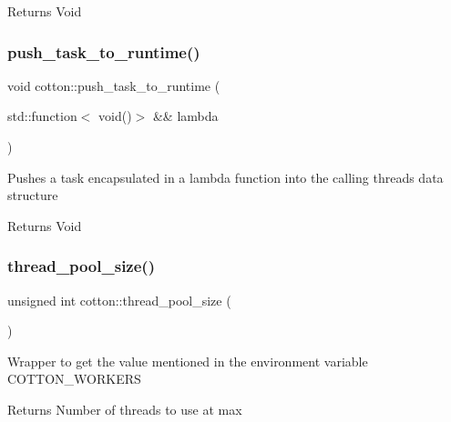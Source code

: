 \begin{DoxyReturn}{Returns}
Void 
\end{DoxyReturn}
\mbox{\label{cotton-runtime_8h_file_a2b2001813bd051cd1ff41a75989667c0}} 
\subsubsection{\texorpdfstring{push\+\_\+task\+\_\+to\+\_\+runtime()}{push\_task\_to\_runtime()}}
{\footnotesize\ttfamily void cotton\+::push\+\_\+task\+\_\+to\+\_\+runtime (\begin{DoxyParamCaption}\item[{std\+::function$<$ void()$>$ \&\&}]{lambda }\end{DoxyParamCaption})}

Pushes a task encapsulated in a lambda function into the calling thread\textquotesingle{}s data structure

\begin{DoxyReturn}{Returns}
Void 
\end{DoxyReturn}
\mbox{\label{cotton-runtime_8h_file_a0b32dd3b6a3d126e107d5c77ec1f4cc3}} 
\subsubsection{\texorpdfstring{thread\+\_\+pool\+\_\+size()}{thread\_pool\_size()}}
{\footnotesize\ttfamily unsigned int cotton\+::thread\+\_\+pool\+\_\+size (\begin{DoxyParamCaption}{ }\end{DoxyParamCaption})}

Wrapper to get the value mentioned in the environment variable C\+O\+T\+T\+O\+N\+\_\+\+W\+O\+R\+K\+E\+RS

\begin{DoxyReturn}{Returns}
Number of threads to use at max 
\end{DoxyReturn}
\mbox{\label{cotton-runtime_8h_file_a361c34063ecb68cf02d417074decb12b}} 
